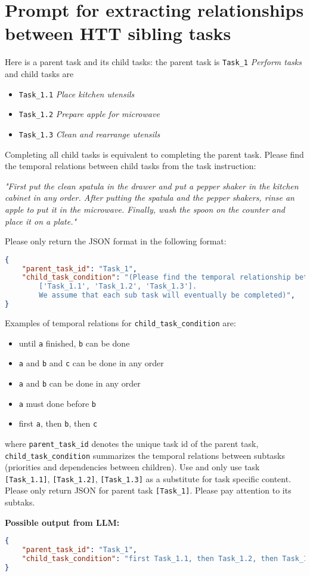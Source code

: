 \documentclass{article}
\begin{document}
\section*{Prompt for extracting relationships between HTT sibling tasks}
Here is a parent task and its child tasks: the parent task is \verb|Task_1| \textit{Perform tasks} and child tasks are 
\begin{itemize}
    \item \verb|Task_1.1| \textit{Place kitchen utensils}
    \item \verb|Task_1.2| \textit{Prepare apple for microwave}
    \item \verb|Task_1.3| \textit{Clean and rearrange utensils}
\end{itemize}
Completing all child tasks is equivalent to completing the parent task.  Please find the temporal relations between child tasks from the task instruction:

\vspace{1em}
\textit{"First put the clean spatula in the drawer and put a pepper shaker in the kitchen cabinet in any order. After putting the spatula and the pepper shakers, rinse an apple to put it in the microwave. Finally, wash the spoon on the counter and place it on a plate."}

\vspace{1em}
Please only return the JSON format in the following format:

\begin{lstlisting}[language=json]
{
    "parent_task_id": "Task_1",
    "child_task_condition": "(Please find the temporal relationship between child tasks 
        ['Task_1.1', 'Task_1.2', 'Task_1.3']. 
        We assume that each sub task will eventually be completed)",
}
\end{lstlisting}
Examples of temporal relations for \verb|child_task_condition| are: 
\begin{itemize}
\item until \texttt{a} finished, \texttt{b} can be done
\item \texttt{a} and \texttt{b} and \texttt{c} can be done in any order
\item \texttt{a} and \texttt{b} can be done in any order 
\item \texttt{a} must done before \texttt{b} 
\item first \texttt{a}, then \texttt{b}, then \texttt{c}
\end{itemize}
where \verb|parent_task_id| denotes the unique task id of the parent task, \verb|child_task_condition| summarizes the temporal relations between subtasks (priorities and dependencies between children). Use and only use task \verb|[Task_1.1]|, \verb|[Task_1.2]|, \verb|[Task_1.3]| as a substitute for task specific content. Please only return JSON for parent task \verb|[Task_1]|. Please pay attention to its subtaks.

\vspace{1em}
\tcblower
\textbf{Possible output from LLM:}

\begin{lstlisting}[language=json]
{
    "parent_task_id": "Task_1",
    "child_task_condition": "first Task_1.1, then Task_1.2, then Task_1.3",
}
\end{lstlisting}
\end{document}
